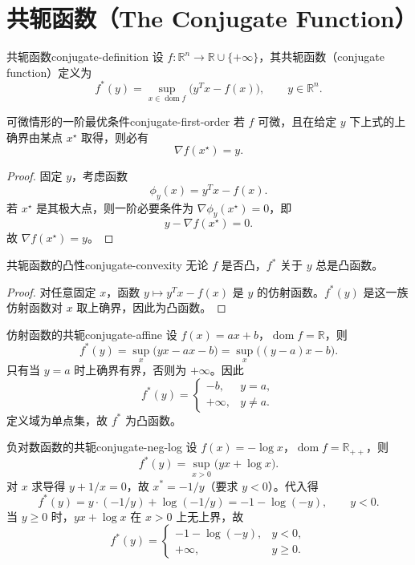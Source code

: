 \documentclass[11pt,a4paper]{article}
\begin{document}
\section{共轭函数（The Conjugate Function）}

\begin{definition}{共轭函数}{conjugate-definition}
设 $f:\mathbb{R}^n\to\mathbb{R}\cup\{+\infty\}$，其共轭函数（conjugate function）定义为
\[
f^*(y)=\sup_{x\in\operatorname{dom}f}\bigl(y^T x-f(x)\bigr),\qquad y\in\mathbb{R}^n.
\]
\end{definition}

\begin{theorem}{可微情形的一阶最优条件}{conjugate-first-order}
若 $f$ 可微，且在给定 $y$ 下上式的上确界由某点 $x^\star$ 取得，则必有
\[
\nabla f(x^\star)=y.
\]
\end{theorem}

\begin{proof}
固定 $y$，考虑函数
\[
\phi_y(x)=y^Tx-f(x).
\]
若 $x^\star$ 是其极大点，则一阶必要条件为 $\nabla\phi_y(x^\star)=0$，即
\[
y-\nabla f(x^\star)=0.
\]
故 $\nabla f(x^\star)=y$。
\end{proof}

\begin{theorem}{共轭函数的凸性}{conjugate-convexity}
无论 $f$ 是否凸，$f^*$ 关于 $y$ 总是凸函数。
\end{theorem}

\begin{proof}
对任意固定 $x$，函数 $y\mapsto y^Tx-f(x)$ 是 $y$ 的仿射函数。$f^*(y)$ 是这一族仿射函数对 $x$ 取上确界，因此为凸函数。
\end{proof}

\begin{example}{仿射函数的共轭}{conjugate-affine}
设 $f(x)=ax+b$，$\operatorname{dom}f=\mathbb{R}$，则
\[
f^*(y)=\sup_x\bigl(yx-ax-b\bigr)
=\sup_x\bigl((y-a)x-b\bigr).
\]
只有当 $y=a$ 时上确界有界，否则为 $+\infty$。因此
\[
f^*(y)=
\begin{cases}
-b, & y=a,\\
+\infty, & y\neq a.
\end{cases}
\]
定义域为单点集，故 $f^*$ 为凸函数。
\end{example}

\begin{example}{负对数函数的共轭}{conjugate-neg-log}
设 $f(x)=-\log x$，$\operatorname{dom}f=\mathbb{R}_{++}$，则
\[
f^*(y)=\sup_{x>0}\bigl(yx+\log x\bigr).
\]
对 $x$ 求导得 $y+1/x=0$，故 $x^*=-1/y$（要求 $y<0$）。代入得
\[
f^*(y)=y\cdot(-1/y)+\log(-1/y)=-1-\log(-y),\qquad y<0.
\]
当 $y\ge0$ 时，$yx+\log x$ 在 $x>0$ 上无上界，故
\[
f^*(y)=
\begin{cases}
-1-\log(-y), & y<0,\\
+\infty, & y\ge0.
\end{cases}
\]
\end{example}
\end{document}

